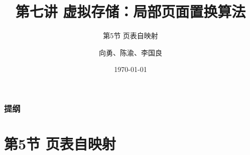 


\title[第7讲]{第七讲 虚拟存储：局部页面置换算法} %
\subtitle{第5节 页表自映射}
\author{向勇、陈渝、李国良} %
\date{\today} %



\begin{frame}
\titlepage %
\end{frame}

\begin{frame}
\frametitle{提纲} %
\tableofcontents %
\end{frame}
\section{第5节 页表自映射}%
